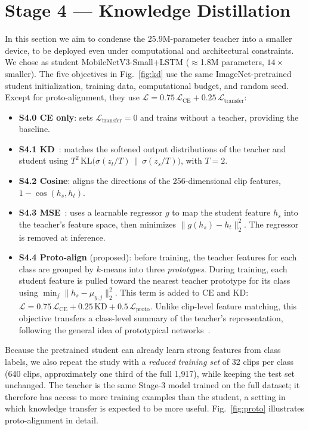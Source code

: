 \documentclass[conference]{IEEEtran}
\begin{document}
\section{Stage 4 --- Knowledge Distillation}
\label{sec:kd}
In this section we aim to condense the 25.9M-parameter teacher into a smaller device, to be deployed even under computational and architectural constraints.
We chose as student MobileNetV3-Small+LSTM ($\approx$1.8M parameters, $14\times$ smaller). The five
objectives in Fig.~\ref{fig:kd} use the same ImageNet-pretrained student initialization,
training data, computational budget, and random seed. Except for proto-alignment, they use
$\mathcal{L}=0.75\,\mathcal{L}_{\text{CE}}+0.25\,\mathcal{L}_{\text{transfer}}$:
\begin{itemize}
\item \textbf{S4.0 CE only}: sets $\mathcal{L}_{\text{transfer}}=0$ and trains without a
teacher, providing the baseline.
\item \textbf{S4.1 KD}~\cite{hinton2015kd}: matches the softened output distributions of
the teacher and student using
$T^2\,\mathrm{KL}\big(\sigma(z_t/T)\,\|\,\sigma(z_s/T)\big)$, with $T=2$.
\item \textbf{S4.2 Cosine}: aligns the directions of the 256-dimensional clip features,
$1-\cos(h_s,h_t)$.
\item \textbf{S4.3 MSE}~\cite{romero2015fitnets}: uses a learnable regressor $g$ to map
the student feature $h_s$ into the teacher's feature space, then minimizes
$\lVert g(h_s)-h_t\rVert_2^2$. The regressor is removed at inference.
\item \textbf{S4.4 Proto-align} (proposed): before training, the teacher features for each
class are grouped by $k$-means into three \emph{prototypes}. During training, each student
feature is pulled toward the nearest teacher prototype for its class using
$\min_j\lVert h_s-\mu_{y,j}\rVert_2^2$. This term is added to CE and KD:
$\mathcal{L}=0.75\,\mathcal{L}_{\text{CE}}+0.25\,\mathrm{KD}+0.5\,\mathcal{L}_{\text{proto}}$.
Unlike clip-level feature matching, this objective transfers a class-level summary of the
teacher's representation, following the general idea of prototypical
networks~\cite{snell2017proto}.
\end{itemize}
Because the pretrained student can already learn strong features from class labels, we
also repeat the study with a \emph{reduced training set} of 32 clips per class (640 clips,
approximately one third of the full 1{,}917), while keeping the test set unchanged. The
teacher is the same Stage-3 model trained on the full dataset; it therefore has access to
more training examples than the student, a setting in which knowledge transfer is expected
to be more useful. Fig.~\ref{fig:proto} illustrates proto-alignment in detail.
\end{document}
